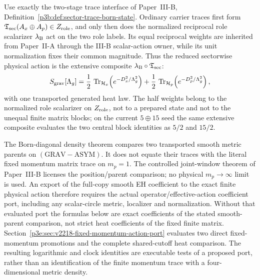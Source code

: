 \documentclass[12pt,a4paper]{article}
\begin{document}
Use exactly the two-stage trace interface of Paper~III-B,
Definition~\ref{p3b:def:sector-trace-born-state}.  Ordinary carrier traces
first form \(\mathfrak T_{\rm sec}(A_x\oplus A_p)\in Z_{\rm role}\), and
only then does the normalized reciprocal role scalarizer \(\lambda_{\rm B}\) act on the two
role labels.  Its equal reciprocal weights are inherited from Paper~II-A through the III-B scalar-action owner, while its unit normalization fixes their common magnitude.  Thus the
reduced sectorwise physical action is the extensive composite
\(\lambda_{\rm B}\circ\mathfrak T_{\rm sec}\):
\begin{equation}
S_{\mathrm{grav}}[\Lambda_g]
=\frac12\,\operatorname{Tr}_{\mathcal H_x}\!\left(e^{-D_x^2/\Lambda_g^2}\right)
+\frac12\,\operatorname{Tr}_{\mathcal H_p}\!\left(e^{-D_p^2/\Lambda_g^2}\right),
\label{p3:eq:Sphys_optionA_recall}
\end{equation}
with one transported generated heat law.  The half weights belong to the normalized role scalarizer on \(Z_{\rm role}\), not to a prepared state and not to the unequal finite matrix blocks; on
the current \(5\oplus15\) seed the same extensive composite evaluates the two
central block identities as \(5/2\) and \(15/2\).

\begin{remark}
\label{p3e:rem:v2211-finite-smooth-action-port}
The Born-diagonal density theorem compares two transported smooth metric
parents on $(\mathrm{GRAV\!-\!ASYM})$. It does not equate their traces
with the literal fixed momentum matrix trace on $m_p=1$. The controlled
joint-window theorem of Paper~III-B licenses the position/parent comparison;
no physical $m_p\to\infty$ limit is used. An export of the full-copy smooth
EH coefficient to the exact finite physical action therefore requires the
actual operator/effective-action coefficient port, including any scalar-circle
metric, localizer and normalization. Without that evaluated port the formulas
below are exact coefficients of the stated smooth-parent comparison, not
strict heat coefficients of the fixed finite matrix.
Section~\ref{p3e:sec:v2218-fixed-momentum-action-port} evaluates two direct
fixed-momentum promotions and the complete shared-cutoff heat comparison.
The resulting logarithmic and clock identities are executable tests of a
proposed port, rather than an identification of the finite momentum trace
with a four-dimensional metric density.
\end{remark}
\end{document}
